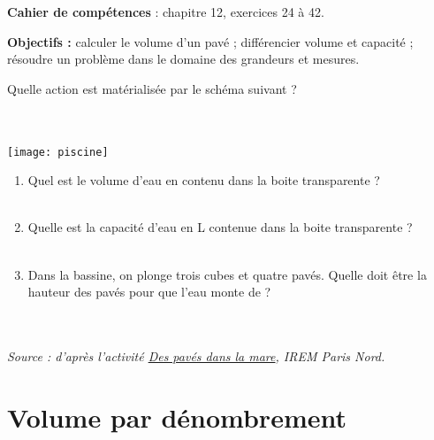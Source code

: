 \vfill

\textcolor{PartieGeometrie}{\sffamily\bfseries Cahier de compétences} : chapitre 12, exercices 24 à 42.


\activites

\begin{activite}
   {\bf Objectifs :} calculer le volume d'un pavé ; différencier volume et capacité ; résoudre un problème dans le domaine des grandeurs et mesures.
   \begin{QCM}
      \partie[observations]
         Quelle action est matérialisée par le schéma suivant ? \\ [2mm]
         \pf \\ [2mm]
         \pf \\
         \begin{center}
            \texttt{[image: piscine]}
         \end{center}
      \partie[questions]
         \begin{enumerate}
            \item Quel est le volume d'eau en \ucmc{} contenu dans la boite transparente ? \\ [2mm]
               \pf \\
            \item Quelle est la capacité d'eau en L contenue dans la boite transparente ? \\ [2mm]
               \pf \\
            \item Dans la bassine, on plonge trois cubes et quatre pavés. Quelle doit être la hauteur des pavés pour que l'eau monte de  ? \\ [2mm]
               \pf \\ [2mm]
               \pf \\ [2mm]
               \pf
         \end{enumerate}
      \end{QCM}
      \vfill \hfill {\it\footnotesize Source : d'après l'activité \href{http://www-irem.univ-paris13.fr/site_spip/IMG/pdf/des_paves_dans_la_mare_2_noir.pdf}{Des pavés dans la mare}, IREM Paris Nord.}
\end{activite}


\cours 

\section{Volume par dénombrement} %

